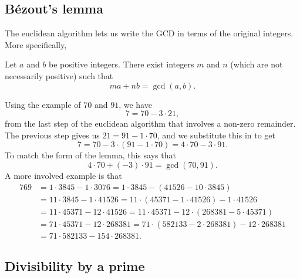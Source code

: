 \subsection{B\'{e}zout's lemma}

The euclidean algorithm lets us write the GCD in terms of the original integers. More specifically,

\begin{lemma}[B\'{e}zout]\label{lem:bezout}
Let $a$ and $b$ be positive integers. There exist integers $m$ and $n$ (which are not necessarily positive) such that
\begin{equation*}
ma + nb = \gcd(a,b).
\end{equation*}
\end{lemma}
Using the example of $70$ and $91$, we have
\begin{equation*}
7 = 70 - 3\cdot 21,
\end{equation*}
from the last step of the euclidean algorithm that involves a non-zero remainder. The previous step gives us $21 = 91 - 1\cdot 70$, and we substitute this in to get
\begin{equation*}
7 = 70 - 3\cdot (91 - 1\cdot 70) = 4\cdot 70 - 3\cdot 91.
\end{equation*}
To match the form of the lemma, this says that
\begin{equation*}
4\cdot 70 + (-3)\cdot 91 = \gcd(70,91).
\end{equation*}
A more involved example is that
\begin{align*}
769 &= 1\cdot 3845 - 1\cdot 3076 = 1\cdot 3845 - (41526 - 10\cdot 3845) \\
&= 11\cdot 3845 - 1\cdot 41526 = 11\cdot (45371 - 1\cdot 41526) - 1\cdot 41526 \\
&= 11\cdot 45371 - 12\cdot 41526 = 11\cdot 45371 - 12\cdot (268381 - 5\cdot 45371) \\
&= 71\cdot 45371 - 12\cdot 268381 = 71\cdot (582133 - 2\cdot 268381) - 12\cdot 268381 \\
&= 71\cdot 582133 - 154\cdot 268381.
\end{align*}


\subsection{Divisibility by a prime}

